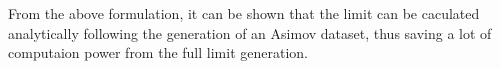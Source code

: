 %


From the above formulation, it can be shown that the limit can be caculated analytically following the generation of an Asimov dataset, thus saving a lot of computaion power from the full limit generation. 


